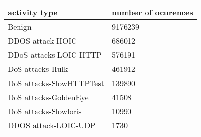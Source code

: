 \begin{tabular}{|p{6cm}|p{6cm}|}

\hline activity type & number of ocurences \\
\hline Benign & 9176239 \\
\hline DDOS attack-HOIC & 686012 \\
\hline DDoS attacks-LOIC-HTTP & 576191 \\
\hline DoS attacks-Hulk & 461912 \\
\hline DoS attacks-SlowHTTPTest & 139890 \\
\hline DoS attacks-GoldenEye & 41508 \\
\hline DoS attacks-Slowloris & 10990 \\
\hline DDOS attack-LOIC-UDP & 1730 \\
\hline

\end{tabular}
